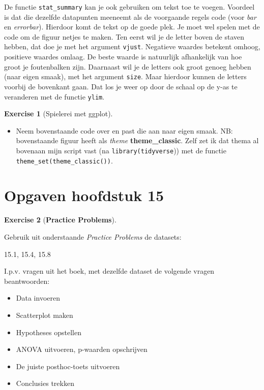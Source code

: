 \documentclass[
  letterpaper,
  DIV=11,
  numbers=noendperiod]{scrreprt}
\providecommand{\tightlist}{%
  \setlength{\itemsep}{0pt}\setlength{\parskip}{0pt}}\usepackage{longtable,booktabs,array}
\theoremstyle{definition}
\newtheorem{exercise}{Exercise}[chapter]
\theoremstyle{remark}
\begin{document}
De functie \texttt{stat\_summary} kan je ook gebruiken om tekst toe te
voegen. Voordeel is dat die dezelfde datapunten meeneemt als de
voorgaande regels code (voor \emph{bar} en \emph{errorbar}). Hierdoor
komt de tekst op de goede plek. Je moet wel spelen met de code om de
figuur netjes te maken. Ten eerst wil je de letter boven de staven
hebben, dat doe je met het argument \texttt{vjust}. Negatieve waardes
betekent omhoog, positieve waardes omlaag. De beste waarde is natuurlijk
afhankelijk van hoe groot je foutenbalken zijn. Daarnaast wil je de
letters ook groot genoeg hebben (naar eigen smaak), met het argument
\texttt{size}. Maar hierdoor kunnen de letters voorbij de bovenkant
gaan. Dat los je weer op door de schaal op de y-as te veranderen met de
functie \texttt{ylim}.

\leavevmode{}%
\begin{exercise}[Spielerei met ggplot]\label{exr-CapLet}

\begin{itemize}
\tightlist
\item
  Neem bovenstaande code over en past die aan naar eigen smaak. NB:
  bovenstaande figuur heeft als \emph{theme} \textbf{theme\_classic}.
  Zelf zet ik dat thema al bovenaan mijn script vast (na
  \texttt{library(tidyverse})) met de functie
  \texttt{theme\_set(theme\_classic())}.
\end{itemize}

\end{exercise}

\hypertarget{opgaven-hoofdstuk-15}{%
\section{Opgaven hoofdstuk 15}\label{opgaven-hoofdstuk-15}}

\leavevmode{}%
\begin{exercise}[\textbf{Practice
Problems}]\label{exr-postdocoefeningen}

Gebruik uit onderstaande \emph{Practice Problems} de datasets:

15.1, 15.4, 15.8

I.p.v. vragen uit het boek, met dezelfde dataset de volgende vragen
beantwoorden:

\begin{itemize}
\tightlist
\item
  Data invoeren
\item
  Scatterplot maken
\item
  Hypotheses opstellen
\item
  ANOVA uitvoeren, p-waarden opschrijven
\item
  De juiste posthoc-toets uitvoeren
\item
  Conclusies trekken
\end{itemize}

\end{exercise}
\end{document}
